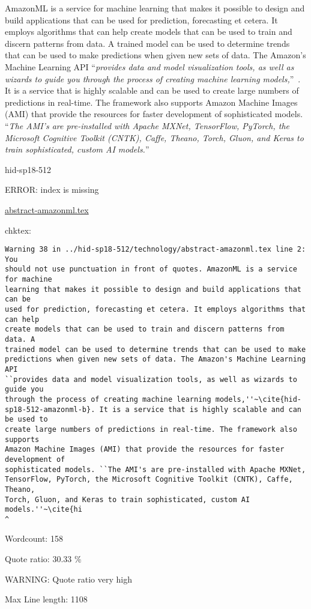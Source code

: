 AmazonML is a service for machine learning that makes it possible to design and build applications that can be used for prediction, forecasting et cetera. It employs algorithms that can help create models that can be used to train and discern patterns from data. A trained model can be used to determine trends that can be used to make predictions when given new sets of data. The Amazon's Machine Learning API \color{blue}``\emph{provides data and model visualization tools, as well as wizards to guide you through the process of creating machine learning models,}''\color{black}~\cite{hid-sp18-512-amazonml-b}. It is a service that is highly scalable and can be used to create large numbers of predictions in real-time. The framework also supports Amazon Machine Images (AMI) that provide the resources for faster development of sophisticated models. \color{blue}``\emph{The AMI's are pre-installed with Apache MXNet, TensorFlow, PyTorch, the Microsoft Cognitive Toolkit (CNTK), Caffe, Theano, Torch, Gluon, and Keras to train sophisticated, custom AI models.}''\color{black}~\cite{hid-sp18-512-amazonml-a}


\begin{IU}

hid-sp18-512

ERROR: index is missing

\href{https://github.com/cloudmesh-community/hid-sp18-512/blob/master//technology/abstract-amazonml.tex}{abstract-amazonml.tex}

 
chktex:
\begin{tiny}
\begin{verbatim}
Warning 38 in ../hid-sp18-512/technology/abstract-amazonml.tex line 2: You
should not use punctuation in front of quotes. AmazonML is a service for machine
learning that makes it possible to design and build applications that can be
used for prediction, forecasting et cetera. It employs algorithms that can help
create models that can be used to train and discern patterns from data. A
trained model can be used to determine trends that can be used to make
predictions when given new sets of data. The Amazon's Machine Learning API
``provides data and model visualization tools, as well as wizards to guide you
through the process of creating machine learning models,''~\cite{hid-
sp18-512-amazonml-b}. It is a service that is highly scalable and can be used to
create large numbers of predictions in real-time. The framework also supports
Amazon Machine Images (AMI) that provide the resources for faster development of
sophisticated models. ``The AMI's are pre-installed with Apache MXNet,
TensorFlow, PyTorch, the Microsoft Cognitive Toolkit (CNTK), Caffe, Theano,
Torch, Gluon, and Keras to train sophisticated, custom AI models.''~\cite{hi
^
\end{verbatim}
\end{tiny}

Wordcount: 158


Quote ratio: 30.33 \%

WARNING: Quote ratio very high
 
Max Line length: 1108
\end{IU}

